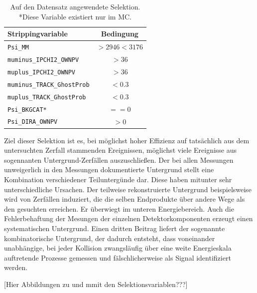 \begin{table}[htb]
  \centering
  \caption{Auf den Datensatz angewendete Selektion. *Diese Variable existiert nur im MC.}
  \begin{tabular}{lc}
    \toprule
    Strippingvariable                 & Bedingung      \\
    \midrule
    \texttt{Psi\_MM}                  & $>\num{2946}<\num{3176}$  \\
    \texttt{muminus\_IPCHI2\_OWNPV}   & $>\num{36}$  \\
    \texttt{muplus\_IPCHI2\_OWNPV}    & $>\num{36}$  \\
    \texttt{muminus\_TRACK\_GhostProb}& $<\num{0.3}$ \\
    \texttt{muplus\_TRACK\_GhostProb} & $<\num{0.3}$ \\
    \texttt{Psi\_BKGCAT*}             & $==\num{0}$  \\
    \texttt{Psi\_DIRA\_OWNPV}         & $>\num{0}$  \\
    \bottomrule
  \end{tabular}
  \label{tab:strip}
\end{table}

Ziel dieser Selektion ist es, bei möglichst hoher Effizienz auf tatsächlich aus dem untersuchten Zerfall stammenden Ereignissen, möglichst viele Ereignisse aus sogennanten Untergrund-Zerfällen auszuschließen. Der bei allen Messungen unweigerlich in den Messungen dokumentierte Untergrund stellt eine Kombination verschiedener Teiluntergünde dar. Diese haben mitunter sehr unterschiedliche Ursachen. Der teilweise rekonstruierte Untergrund beispielsweise wird von Zerfällen induziert, die die selben Endprodukte über andere Wege als den gesuchten erreichen. Er überwiegt im unteren Energiebereich. Auch die Fehlerbehaftung der Mesungen der einzelnen Detektorkomponenten erzeugt einen systematischen Untergrund. Einen dritten Beitrag liefert der sogenannte kombinatorische Untergrund, der dadurch entsteht, dass voneinander unabhängige, bei jeder Kollision zwangsläufig über eine weite Energieskala auftretende Prozesse gemessen und fälschlicherweise als Signal identifiziert werden.

[Hier Abbildungen zu und mmit den Selektionsvariablen???]

